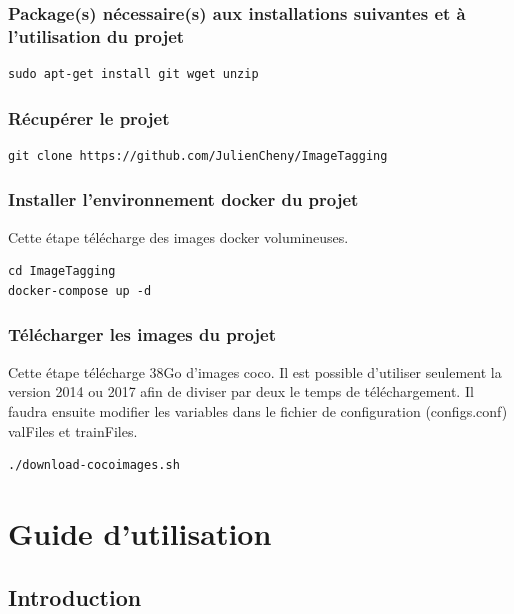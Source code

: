 \documentclass[debug,nodate,hideweeklyreports]{polytech/polytech}
\begin{document}
\subsection{Package(s) nécessaire(s) aux installations suivantes et à l'utilisation du projet}

\begin{lstlisting}
sudo apt-get install git wget unzip
\end{lstlisting}

\subsection{Récupérer le projet}

\begin{lstlisting}
git clone https://github.com/JulienCheny/ImageTagging
\end{lstlisting}

\subsection{Installer l'environnement docker du projet}

Cette étape télécharge des images docker volumineuses.

\begin{lstlisting}
cd ImageTagging
docker-compose up -d
\end{lstlisting}

\subsection{Télécharger les images du projet}

Cette étape télécharge 38Go d'images coco. 
Il est possible d'utiliser seulement la version 2014 ou 2017 afin de diviser par deux le temps de téléchargement. Il faudra ensuite modifier les variables dans le fichier de configuration (configs.conf) valFiles et trainFiles.

\begin{lstlisting}
./download-cocoimages.sh
\end{lstlisting}

\chapter{Guide d'utilisation}
\label{ann:guideutilisation}

\section{Introduction}
\end{document}
